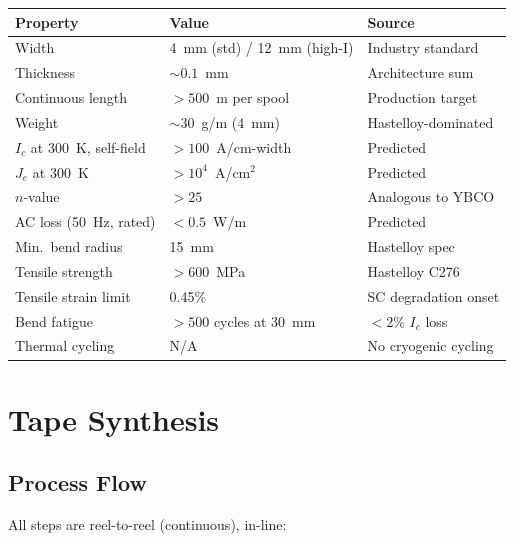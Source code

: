 \documentclass[11pt, a4paper]{article}
\begin{document}
\begin{center}
\begin{tabular}{@{}lll@{}}
\toprule
\textbf{Property} & \textbf{Value} & \textbf{Source} \\
\midrule
Width & 4~mm (std) / 12~mm (high-I) & Industry standard \\
Thickness & $\sim 0.1$~mm & Architecture sum \\
Continuous length & $> 500$~m per spool & Production target \\
Weight & $\sim 30$~g/m (4~mm) & Hastelloy-dominated \\
\midrule
$I_c$ at 300~K, self-field & $> 100$~A/cm-width & Predicted \\
$J_e$ at 300~K & $> 10^4$~A/cm$^2$ & Predicted \\
$n$-value & $> 25$ & Analogous to YBCO \\
AC loss (50~Hz, rated) & $< 0.5$~W/m & Predicted \\
\midrule
Min.\ bend radius & 15~mm & Hastelloy spec \\
Tensile strength & $> 600$~MPa & Hastelloy C276 \\
Tensile strain limit & 0.45\% & SC degradation onset \\
Bend fatigue & $> 500$ cycles at 30~mm & $< 2\%$ $I_c$ loss \\
Thermal cycling & N/A & No cryogenic cycling \\
\bottomrule
\end{tabular}
\end{center}

\section{Tape Synthesis}
\label{sec:synthesis}

\subsection{Process Flow}

All steps are reel-to-reel (continuous), in-line:
\end{document}
